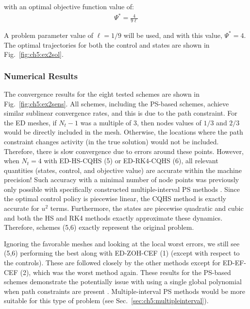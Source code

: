 \noindent with an optimal objective function value of:
\begin{align}
\Psi^* = \frac{4}{9\ell}
\end{align}

\noindent A problem parameter value of $\ell = 1/9$ will be used, and with this value, $\Psi^* = 4$.
The optimal trajectories for both the control and states are shown in Fig.~\ref{fig:ch5:ex2sol}.

\subsubsection{Numerical Results}

The convergence results for the eight tested schemes are shown in Fig.~\ref{fig:ch5:ex2sens}.
All schemes, including the PS-based schemes, achieve similar sublinear convergence rates, and this is due to the path constraint.
For the ED meshes, if $N_t-1$ was a multiple of 3, then nodes values of $1/3$ and $2/3$ would be directly included in the mesh.
Otherwise, the locations where the path constraint changes activity (in the true solution) would not be included.
Therefore, there is slow convergence due to errors around these points.
However, when $N_t=4$ with ED-HS-CQHS (5) or ED-RK4-CQHS (6), all relevant quantities (states, control, and objective value) are accurate within the machine precision!
Such accuracy with a minimal number of node points was previously only possible with specifically constructed multiple-interval PS methods \cite{Herber2015a}.
Since the optimal control policy is piecewise linear, the CQHS method is exactly accurate for $u^2$ terms.
Furthermore, the states are piecewise quadratic and cubic and both the HS and RK4 methods exactly approximate these dynamics.
Therefore, schemes (5,6) exactly represent the original problem.

Ignoring the favorable meshes and looking at the local worst errors, we still see (5,6) performing the best along with ED-ZOH-CEF (1) (except with respect to the controls).
These are followed closely by the other methods except for ED-EF-CEF (2), which was the worst method again.
These results for the PS-based schemes demonstrate the potentially issue with using a single global polynomial when path constraints are present \cite{Darby2009a, Darby2011a}.
Multiple-interval PS methods would be more suitable for this type of problem (see Sec.~\ref{sec:ch5:multipleinterval}).

